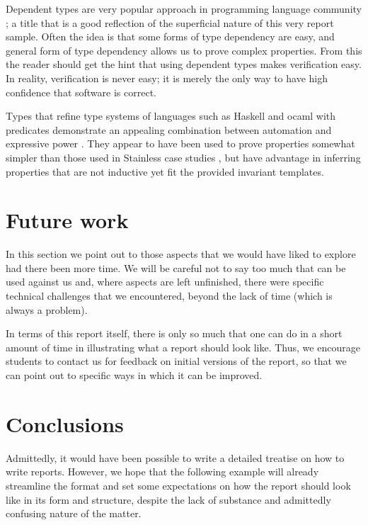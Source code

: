 \documentclass[a4paper,UKenglish,cleveref, autoref, thm-restate]{lipics-v2021}
\begin{document}
Dependent types are very popular approach in programming language community \cite{fakingIt}; a title
that is a good reflection of the superficial nature of this very report sample.
Often the idea is that some forms of type dependency are easy, and general form of type dependency
allows us to prove complex properties. From this the reader should get the hint that using dependent
types makes verification easy. In reality, verification is never easy; it is merely the only way
to have high confidence that software is correct.

Types that refine type systems of languages such as Haskell and ocaml with predicates demonstrate
an appealing combination between automation and expressive power \cite{10.1145/2858949.2784745}. They appear
to have been used to prove properties somewhat simpler than those used in Stainless case studies
\cite{HamzaETAL19SystemFR}, but have advantage in inferring properties that are not inductive
yet fit the provided invariant templates.

\section{Future work}

In this section we point out to those aspects that we would have liked to explore had there been
more time. We will be careful not to say too much that can be used against us and, where aspects
are left unfinished, there were specific technical challenges that we encountered, beyond the lack
of time (which is always a problem).

In terms of this report itself, there is only so much that
one can do in a short amount of time in illustrating what a
report should look like. Thus, we encourage students to contact
us for feedback on initial versions of the report, so that we can
point out to specific ways in which it can be improved.

\section{Conclusions}

Admittedly, it would have been possible to write a detailed
treatise on how to write reports. However, we hope that the
following example will already streamline the format and set
some expectations on how the report should look like in its
form and structure, despite the lack of substance and
admittedly confusing nature of the matter.
\end{document}
